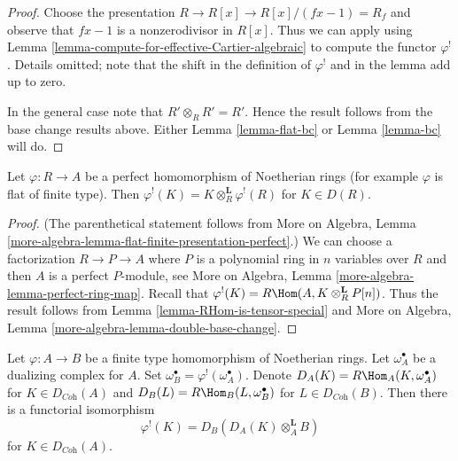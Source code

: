 \begin{proof}
Choose the presentation $R \to R[x] \to R[x]/(fx - 1) = R_f$ and observe
that $fx - 1$ is a nonzerodivisor in $R[x]$. Thus we can apply
using Lemma \ref{lemma-compute-for-effective-Cartier-algebraic}
to compute the functor $\varphi^!$. Details omitted;
note that the shift in the definition
of $\varphi^!$ and in the lemma add up to zero.

\medskip\noindent
In the general case note that $R' \otimes_R R' = R'$.
Hence the result follows from the base change results
above. Either Lemma \ref{lemma-flat-bc} or
Lemma \ref{lemma-bc} will do.
\end{proof}

\begin{lemma}
\label{lemma-upper-shriek-is-tensor-functor}
Let $\varphi : R \to A$ be a perfect homomorphism of Noetherian rings
(for example $\varphi$ is flat of finite type).
Then $\varphi^!(K) = K \otimes_R^\mathbf{L} \varphi^!(R)$
for $K \in D(R)$.
\end{lemma}

\begin{proof}
(The parenthetical statement follows from
More on Algebra, Lemma
\ref{more-algebra-lemma-flat-finite-presentation-perfect}.)
We can choose a factorization $R \to P \to A$ where $P$ is a polynomial
ring in $n$ variables over $R$ and then $A$ is a perfect $P$-module, see
More on Algebra, Lemma \ref{more-algebra-lemma-perfect-ring-map}.
Recall that $\varphi^!(K) = R\Hom(A, K \otimes_R^\mathbf{L} P[n])$.
Thus the result follows from
Lemma \ref{lemma-RHom-is-tensor-special}
and More on Algebra, Lemma \ref{more-algebra-lemma-double-base-change}.
\end{proof}

\begin{lemma}
\label{lemma-relative-dualizing-if-have-omega}
Let $\varphi : A \to B$ be a finite type homomorphism of Noetherian rings.
Let $\omega_A^\bullet$ be a dualizing complex for $A$. Set
$\omega_B^\bullet = \varphi^!(\omega_A^\bullet)$. Denote
$D_A(K) = R\Hom_A(K, \omega_A^\bullet)$ for $K \in D_{\textit{Coh}}(A)$
and
$D_B(L) = R\Hom_B(L, \omega_B^\bullet)$ for $L \in D_{\textit{Coh}}(B)$.
Then there is a functorial isomorphism
$$
\varphi^!(K) = D_B(D_A(K) \otimes_A^\mathbf{L} B)
$$
for $K \in D_{\textit{Coh}}(A)$.
\end{lemma}

